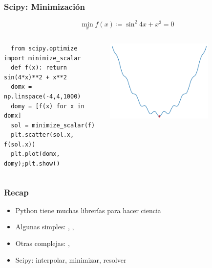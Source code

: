 \documentclass[14pt,aspectratio=169,xcolor=dvipsnames]{beamer}
\begin{document}
\begin{frame}[t,fragile]\frametitle{Scipy: Minimización}
    \begin{small}
    $$ \min_ x f(x) \coloneqq \sin^2 4x + x^2  = 0  $$
    \vspace{-0.5cm}
    \begin{columns}
        \begin{column}{0.49\textwidth}
    \begin{verbatim}  
  from scipy.optimize import minimize_scalar 
  def f(x): return sin(4*x)**2 + x**2
  domx = np.linspace(-4,4,1000)
  domy = [f(x) for x in domx]
  sol = minimize_scalar(f)
  plt.scatter(sol.x, f(sol.x))
  plt.plot(domx, domy);plt.show()
    \end{verbatim}
        \end{column}
        \begin{column}{0.5\textwidth}
            \begin{flushright}
                \includegraphics[width=0.7\textwidth]{../images/scipy-min.png}
            \end{flushright}
        \end{column}
    \end{columns}
    \end{small}
\end{frame}
\begin{frame}\frametitle{Recap}
    \begin{itemize}
        \item Python tiene muchas librerías para hacer ciencia
        \item Algunas simples: , , 
        \item Otras complejas: , 
        \item Scipy: interpolar, minimizar, resolver
    \end{itemize}
\end{frame}
\end{document}
